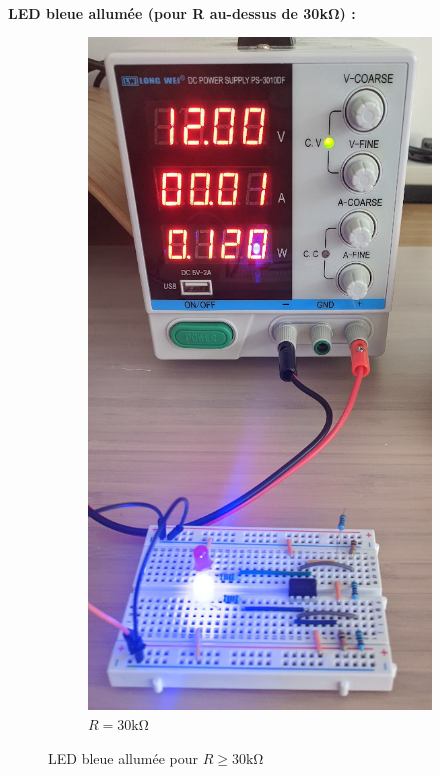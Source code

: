 \documentclass{article}
\begin{document}
\paragraph{}
\textbf{LED bleue allumée (pour R au-dessus de 30\si{\kilo\ohm}) :}
\begin{figure}[H]
    \centering
    \begin{subfigure}{.45\textwidth}
        \centering
        \includegraphics[width=.45\linewidth]{./images/labo4-30k.jpg}  
        \caption{$R = 30\si{\kilo\ohm}$}
    \end{subfigure}
    \caption{LED bleue allumée pour $R \ge 30\si{\kilo\ohm}$}
\end{figure}

\newpage
\end{document}
